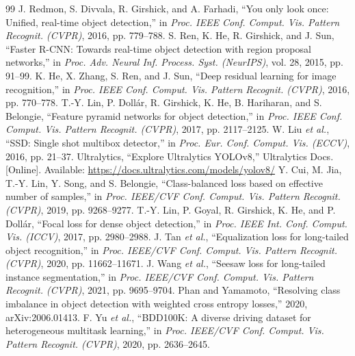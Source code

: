 \documentclass[10pt,journal,letterpaper]{IEEEtran}
\begin{document}
\begin{thebibliography}{99}
 J. Redmon, S. Divvala, R. Girshick, and A. Farhadi, ``You only look once: Unified, real-time object detection,'' in \textit{Proc. IEEE Conf. Comput. Vis. Pattern Recognit. (CVPR)}, 2016, pp. 779--788.
 S. Ren, K. He, R. Girshick, and J. Sun, ``Faster R-CNN: Towards real-time object detection with region proposal networks,'' in \textit{Proc. Adv. Neural Inf. Process. Syst. (NeurIPS)}, vol. 28, 2015, pp. 91--99.
 K. He, X. Zhang, S. Ren, and J. Sun, ``Deep residual learning for image recognition,'' in \textit{Proc. IEEE Conf. Comput. Vis. Pattern Recognit. (CVPR)}, 2016, pp. 770--778.
 T.-Y. Lin, P. Doll\'ar, R. Girshick, K. He, B. Hariharan, and S. Belongie, ``Feature pyramid networks for object detection,'' in \textit{Proc. IEEE Conf. Comput. Vis. Pattern Recognit. (CVPR)}, 2017, pp. 2117--2125.
 W. Liu \textit{et al.}, ``SSD: Single shot multibox detector,'' in \textit{Proc. Eur. Conf. Comput. Vis. (ECCV)}, 2016, pp. 21--37.
 Ultralytics, ``Explore Ultralytics YOLOv8,'' Ultralytics Docs. [Online]. Available: \url{https://docs.ultralytics.com/models/yolov8/}
 Y. Cui, M. Jia, T.-Y. Lin, Y. Song, and S. Belongie, ``Class-balanced loss based on effective number of samples,'' in \textit{Proc. IEEE/CVF Conf. Comput. Vis. Pattern Recognit. (CVPR)}, 2019, pp. 9268--9277.
 T.-Y. Lin, P. Goyal, R. Girshick, K. He, and P. Doll\'ar, ``Focal loss for dense object detection,'' in \textit{Proc. IEEE Int. Conf. Comput. Vis. (ICCV)}, 2017, pp. 2980--2988.
 J. Tan \textit{et al.}, ``Equalization loss for long-tailed object recognition,'' in \textit{Proc. IEEE/CVF Conf. Comput. Vis. Pattern Recognit. (CVPR)}, 2020, pp. 11662--11671.
 J. Wang \textit{et al.}, ``Seesaw loss for long-tailed instance segmentation,'' in \textit{Proc. IEEE/CVF Conf. Comput. Vis. Pattern Recognit. (CVPR)}, 2021, pp. 9695--9704.
 Phan and Yamamoto, ``Resolving class imbalance in object detection with weighted cross entropy losses,'' 2020, arXiv:2006.01413.
 F. Yu \textit{et al.}, ``BDD100K: A diverse driving dataset for heterogeneous multitask learning,'' in \textit{Proc. IEEE/CVF Conf. Comput. Vis. Pattern Recognit. (CVPR)}, 2020, pp. 2636--2645.

\end{thebibliography}
\end{document}
